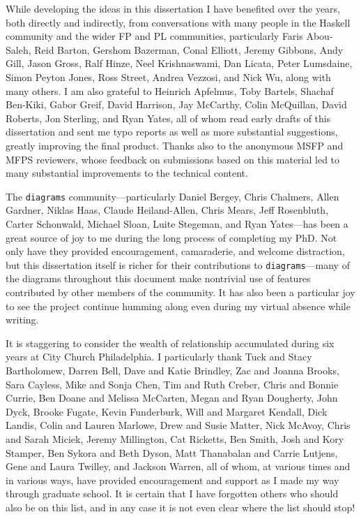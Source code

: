 While developing the ideas in this dissertation I have benefited over
the years, both directly and indirectly, from conversations with many
people in the Haskell community and the wider FP and PL communities,
particularly Faris Abou-Saleh, Reid Barton, Gershom Bazerman, Conal
Elliott, Jeremy Gibbons, Andy Gill, Jason Gross, Ralf Hinze, Neel
Krishnaswami, Dan Licata, Peter Lumsdaine, Simon Peyton Jones, Ross
Street, Andrea Vezzosi, and Nick Wu, along with many others.  I am
also grateful to Heinrich Apfelmus, Toby Bartels, Shachaf Ben-Kiki, Gabor Greif, David Harrison,
Jay McCarthy, Colin McQuillan, David Roberts, Jon Sterling, and Ryan
Yates, all of whom read early drafts of this dissertation and sent me
typo reports as well as more substantial suggestions, greatly
improving the final product.  Thanks also to the anonymous MSFP and
MFPS reviewers, whose feedback on submissions based on this material
led to many substantial improvements to the technical content.

The \texttt{diagrams} community---particularly Daniel Bergey, Chris
Chalmers, Allen Gardner, Niklas Haas, Claude Heiland-Allen, Chris
Mears, Jeff Rosenbluth, Carter Schonwald, Michael Sloan, Luite
Stegeman, and Ryan Yates---has been a great source of joy to me during
the long process of completing my PhD.  Not only have they provided
encouragement, camaraderie, and welcome distraction, but this
dissertation itself is richer for their contributions to
\texttt{diagrams}---many of the diagrams throughout this document make
nontrivial use of features contributed by other members of the
community.  It has also been a particular joy to see the project
continue humming along even during my virtual absence while writing.

It is staggering to consider the wealth of relationship accumulated
during six years at City Church Philadelphia.  I particularly thank
Tuck and Stacy Bartholomew, Darren Bell, Dave and Katie Brindley, Zac
and Joanna Brooks, Sara Cayless, Mike and Sonja Chen, Tim and Ruth
Creber, Chris and Bonnie Currie, Ben Doane and Melissa McCarten, Megan and Ryan Dougherty, John
Dyck, Brooke Fugate, Kevin Funderburk, Will and Margaret Kendall, Dick Landis, Colin and Lauren
Marlowe, Drew and Susie Matter, Nick McAvoy, Chris and Sarah Miciek,
Jeremy Millington, Cat Ricketts, Ben Smith, Josh and Kory Stamper, Ben
Sykora and Beth Dyson, Matt Thanabalan and Carrie Lutjens, Gene and
Laura Twilley, and Jackson Warren, all of whom, at various times and
in various ways, have provided encouragement and support as I made my
way through graduate school. It is certain that I have forgotten
others who should also be on this list, and in any case it is not even
clear where the list should stop!

